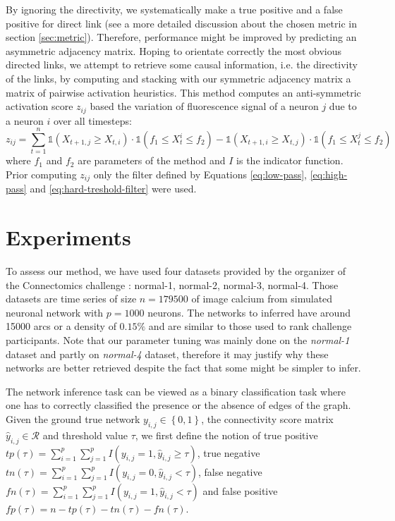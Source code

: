 \documentclass[wcp]{jmlr}
\begin{document}
By ignoring the directivity, we systematically make a true positive and a
false positive for direct link (see a more detailed discussion about the
chosen metric in section \ref{sec:metric}). Therefore, performance might be
improved by predicting an asymmetric adjacency matrix. Hoping to orientate
correctly the most obvious directed links, we attempt to retrieve some causal
information, i.e. the directivity of the links, by computing and stacking with
our symmetric adjacency matrix a matrix of pairwise activation heuristics.
This method computes an anti-symmetric activation score $z_{ij}$ based the
variation of fluorescence signal of a neuron $j$ due to a neuron $i$ over all
timesteps:
\[
z_{ij} = \sum_{t=1}^n \mathbb{1}(X_{t+1,j} \ge X_{t, i}) \cdot
\mathbb{1}(f_1\le X_t^i \le f_2) -  \mathbb{1}(X_{t+1,i} \ge X_{t, j}) \cdot
\mathbb{1}(f_1 \le X_t^j \le f_2)
\]
where $f_1$ and $f_2$ are parameters of the method and $I$ is the indicator
function. Prior computing $z_{ij}$ only the filter defined by Equations
\ref{eq:low-pass}, \ref{eq:high-pass} and \ref{eq:hard-treshold-filter} were
used.

\section{Experiments}

To assess our method, we have used four datasets provided by the organizer
of the Connectomics challenge : normal-1, normal-2, normal-3, normal-4. Those
datasets are time series of size $n=179500$ of image calcium from simulated
neuronal network \cite{stetter2012model} with $p=1000$ neurons. The networks
to inferred have around 15000 arcs or a density of $0.15\%$ and are similar to those
used to rank challenge participants. Note that our parameter tuning was mainly
done on the \textit{normal-1} dataset and partly on \textit{normal-4} dataset,
therefore it may justify why these networks are better retrieved despite the
fact that some might be simpler to infer.

The network inference task can be viewed as a binary classification task
where one has to correctly classified the presence or the absence of edges
of the graph. Given the ground true network $y_{i,j} \in \left\{0, 1\right\}$,
the connectivity score matrix $\hat{y}_{i,j} \in \mathcal{R}$
and threshold value $\tau$, we first define the notion of
true positive $tp(\tau) = \sum_{i=1}^p \sum_{j=1}^p I(y_{i,j} = 1, \hat{y}_{i,j} \geq \tau)$,
true negative $tn(\tau) = \sum_{i=1}^p \sum_{j=1}^p I(y_{i,j} = 0, \hat{y}_{i,j} < \tau)$,
false negative $fn(\tau) = \sum_{i=1}^p \sum_{j=1}^p I(y_{i,j} = 1, \hat{y}_{i,j} < \tau)$ and
false positive $fp(\tau) = n - tp(\tau) - tn(\tau) -fn(\tau)$.
\end{document}
